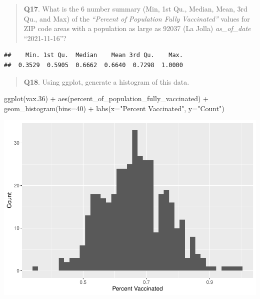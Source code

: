 \documentclass[
]{article}
\newenvironment{Shaded}{\begin{snugshade}}{\end{snugshade}}
\newcommand{\AttributeTok}[1]{\textcolor[rgb]{0.77,0.63,0.00}{#1}}
\newcommand{\DecValTok}[1]{\textcolor[rgb]{0.00,0.00,0.81}{#1}}
\newcommand{\FloatTok}[1]{\textcolor[rgb]{0.00,0.00,0.81}{#1}}
\newcommand{\FunctionTok}[1]{\textcolor[rgb]{0.00,0.00,0.00}{#1}}
\newcommand{\NormalTok}[1]{#1}
\newcommand{\SpecialCharTok}[1]{\textcolor[rgb]{0.00,0.00,0.00}{#1}}
\newcommand{\StringTok}[1]{\textcolor[rgb]{0.31,0.60,0.02}{#1}}
\begin{document}
\begin{quote}
\textbf{Q17}. What is the 6 number summary (Min, 1st Qu., Median, Mean,
3rd Qu., and Max) of the \emph{``Percent of Population Fully
Vaccinated''} values for ZIP code areas with a population as large as
92037 (La Jolla) \emph{as\_of\_date} ``2021-11-16''?
\end{quote}

\begin{Shaded}
\end{Shaded}

\begin{verbatim}
##    Min. 1st Qu.  Median    Mean 3rd Qu.    Max. 
##  0.3529  0.5905  0.6662  0.6640  0.7298  1.0000
\end{verbatim}

\begin{quote}
\textbf{Q18}. Using ggplot, generate a histogram of this data.
\end{quote}

\begin{Shaded}
\begin{Highlighting}[]
\FunctionTok{ggplot}\NormalTok{(vax}\FloatTok{.36}\NormalTok{) }\SpecialCharTok{+} \FunctionTok{aes}\NormalTok{(percent\_of\_population\_fully\_vaccinated) }\SpecialCharTok{+} 
  \FunctionTok{geom\_histogram}\NormalTok{(}\AttributeTok{bins=}\DecValTok{40}\NormalTok{) }\SpecialCharTok{+} \FunctionTok{labs}\NormalTok{(}\AttributeTok{x=}\StringTok{"Percent Vaccinated"}\NormalTok{, }\AttributeTok{y=}\StringTok{"Count"}\NormalTok{)}
\end{Highlighting}
\end{Shaded}

\includegraphics{Class17_files/figure-latex/unnamed-chunk-36-1.pdf}
\end{document}
